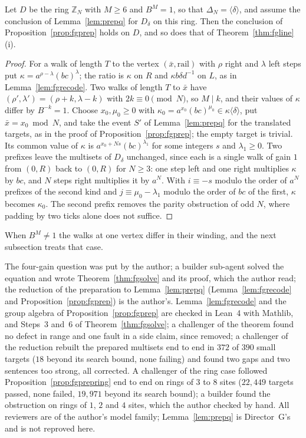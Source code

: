 \begin{proposition}\label{prop:fgprepring}
Let $D$ be the ring $\mathbb{Z}_N$ with $M\ge6$ and $B^{M}=1$, so that $\Delta_N=\langle\delta\rangle$, and assume the conclusion of Lemma~\ref{lem:prepq} for $D_\delta$ on this ring. Then the conclusion of Proposition~\ref{prop:fgprep} holds on $D$, and so does that of Theorem~\ref{thm:fgline}(i).
\end{proposition}
\begin{proof}
For a walk of length $T$ to the vertex $(\bar x,\text{rail})$ with $\rho$ right and $\lambda$ left steps put $\kappa=a^{\rho-\lambda}(bc)^{\lambda}$; the ratio is $\kappa$ on $R$ and $\kappa b\delta d^{-1}$ on $L$, as in Lemma~\ref{lem:fgrecode}. Two walks of length $T$ to $\bar x$ have $(\rho',\lambda')=(\rho+k,\lambda-k)$ with $2k\equiv0\pmod N$, so $M\mid k$, and their values of $\kappa$ differ by $B^{-k}=1$. Choose $x_0,\mu_0\ge0$ with $\kappa_0=a^{x_0}(bc)^{\mu_0}\in\kappa\langle\delta\rangle$, put $\bar x=x_0\bmod N$, and take the event $S'$ of Lemma~\ref{lem:prepq} for the translated targets, as in the proof of Proposition~\ref{prop:fgprep}; the empty target is trivial. Its common value of $\kappa$ is $a^{x_0+Ns}(bc)^{\lambda_1}$ for some integers $s$ and $\lambda_1\ge0$. Two prefixes leave the multisets of $D_\delta$ unchanged, since each is a single walk of gain $1$ from $(0,R)$ back to $(0,R)$ for $N\ge3$: one step left and one right multiplies $\kappa$ by $bc$, and $N$ steps right multiplies it by $a^{N}$. With $i\equiv-s$ modulo the order of $a^N$ prefixes of the second kind and $j\equiv\mu_0-\lambda_1$ modulo the order of $bc$ of the first, $\kappa$ becomes $\kappa_0$. The second prefix removes the parity obstruction of odd $N$, where padding by two ticks alone does not suffice.
\end{proof}

When $B^M\ne1$ the walks at one vertex differ in their winding, and the next subsection treats that case.

The four-gain question was put by the author; a builder sub-agent solved the equation and wrote Theorem~\ref{thm:fgsolve} and its proof, which the author read; the reduction of the preparation to Lemma~\ref{lem:prepq} (Lemma~\ref{lem:fgrecode} and Proposition~\ref{prop:fgprep}) is the author's. Lemma~\ref{lem:fgrecode} and the group algebra of Proposition~\ref{prop:fgprep} are checked in Lean~4 with Mathlib, and Steps~3 and~6 of Theorem~\ref{thm:fgsolve}; a challenger of the theorem found no defect in range and one fault in a side claim, since removed; a challenger of the reduction rebuilt the prepared multisets end to end in $372$ of $390$ small targets ($18$ beyond its search bound, none failing) and found two gaps and two sentences too strong, all corrected. A challenger of the ring case followed Proposition~\ref{prop:fgprepring} end to end on rings of $3$ to $8$ sites ($22{,}449$ targets passed, none failed, $19{,}971$ beyond its search bound); a builder found the obstruction on rings of $1$, $2$ and $4$ sites, which the author checked by hand. All reviewers are of the author's model family; Lemma~\ref{lem:prepq} is Director~G's and is not reproved here.

